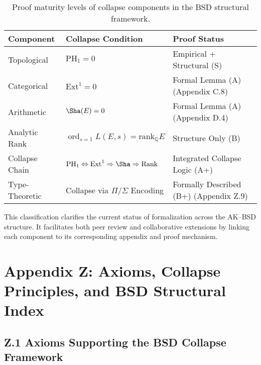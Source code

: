 \begin{table}[H]
\centering
\begin{tabular}{lll}
\toprule
\textbf{Component} & \textbf{Collapse Condition} & \textbf{Proof Status} \\
\midrule
Topological        & \( \mathrm{PH}_1 = 0 \)              & Empirical + Structural (S) \\
Categorical        & \( \mathrm{Ext}^1 = 0 \)             & Formal Lemma (A) \quad (Appendix C.8) \\
Arithmetic         & \( \Sha(E) = 0 \)                    & Formal Lemma (A) \quad (Appendix D.4) \\
Analytic Rank      & \( \operatorname{ord}_{s=1} L(E,s) = \mathrm{rank}_\mathbb{Q}E \) & Structure Only (B) \\
Collapse Chain     & \( \mathrm{PH}_1 \Leftrightarrow \mathrm{Ext}^1 \Rightarrow \Sha \Rightarrow \text{Rank} \) & Integrated Collapse Logic (A+) \\
Type-Theoretic     & Collapse via \( \Pi/\Sigma \) Encoding & Formally Described (B+) \quad (Appendix Z.9) \\
\bottomrule
\end{tabular}
\caption{Proof maturity levels of collapse components in the BSD structural framework.}
\end{table}

\begin{remark}
This classification clarifies the current status of formalization across the AK–BSD structure.  
It facilitates both peer review and collaborative extensions by linking each component  
to its corresponding appendix and proof mechanism.
\end{remark}



\section*{Appendix Z: Axioms, Collapse Principles, and BSD Structural Index}

\subsection*{Z.1 Axioms Supporting the BSD Collapse Framework}

